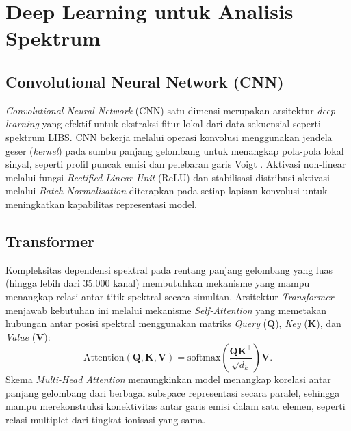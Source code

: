 \section{Deep Learning untuk Analisis Spektrum}

\subsection{Convolutional Neural Network (CNN)}

\textit{Convolutional Neural Network} (CNN) satu dimensi merupakan arsitektur \textit{deep learning} yang efektif untuk ekstraksi fitur lokal dari data sekuensial seperti spektrum LIBS. CNN bekerja melalui operasi konvolusi menggunakan jendela geser (\textit{kernel}) pada sumbu panjang gelombang untuk menangkap pola-pola lokal sinyal, seperti profil puncak emisi dan pelebaran garis Voigt \citep{he_deep_2016}. Aktivasi non-linear melalui fungsi \textit{Rectified Linear Unit} (ReLU) dan stabilisasi distribusi aktivasi melalui \textit{Batch Normalisation} \citep{ioffe_batch_2015} diterapkan pada setiap lapisan konvolusi untuk meningkatkan kapabilitas representasi model.

\subsection{Transformer}

Kompleksitas dependensi spektral pada rentang panjang gelombang yang luas (hingga lebih dari 35.000 kanal) membutuhkan mekanisme yang mampu menangkap relasi antar titik spektral secara simultan. Arsitektur \textit{Transformer} \citep{vaswani_attention_2017} menjawab kebutuhan ini melalui mekanisme \textit{Self-Attention} yang memetakan hubungan antar posisi spektral menggunakan matriks \textit{Query} ($\mathbf{Q}$), \textit{Key} ($\mathbf{K}$), dan \textit{Value} ($\mathbf{V}$):
\begin{equation} \label{eq:bab2_attention}
\mathrm{Attention}(\mathbf{Q},\mathbf{K},\mathbf{V}) = \mathrm{softmax}\!\left(\frac{\mathbf{Q}\mathbf{K}^\top}{\sqrt{d_k}}\right)\mathbf{V}.
\end{equation}
Skema \textit{Multi-Head Attention} memungkinkan model menangkap korelasi antar panjang gelombang dari berbagai subspace representasi secara paralel, sehingga mampu merekonstruksi konektivitas antar garis emisi dalam satu elemen, seperti relasi multiplet dari tingkat ionisasi yang sama.

